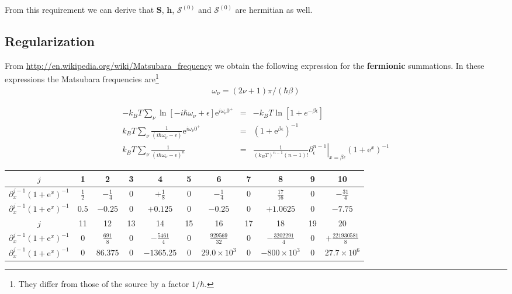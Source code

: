 \documentclass[11pt,a4paper]{report}
\newcommand{\e}[1]{\mathrm{e}^{#1}}%
\newcommand{\mat}[1]{\bm{#1}}  %
\begin{document}
From this requirement we can derive that $\mat{S}$, $\mat{h}$,
$\mat{\mathcal{S}}^{(0)}$ and $\mat{\mathcal{S}}^{(0)}$ are hermitian as well.

\subsection{Regularization}
From \url{http://en.wikipedia.org/wiki/Matsubara_frequency} we obtain
the following expression for the \textbf{fermionic} summations.  In
these expressions the Matsubara frequencies are\footnote{They differ
  from those of the source by a factor $1/\hbar$.}
\begin{eqnarray}
\omega_\nu=(2\nu+1)\pi/(\hbar\beta)
\end{eqnarray}


\begin{eqnarray}
-k_BT\sum_\nu\ln[-i\hbar\omega_\nu+\epsilon]\e{i\omega_\nu0^+}
&=&-k_BT\ln[1+e^{-\beta \epsilon}]
\\
k_BT\sum_\nu \frac{1}{(i\hbar\omega_\nu-\epsilon)}\e{i\omega_\nu 0^+}
&=&(1+\e{\beta \epsilon})^{-1}
\\
k_BT\sum_\nu \frac{1}{(i\hbar\omega_\nu-\epsilon)^n}
&=&\frac{1}{(k_BT)^{n-1}(n-1)!}
\left.\partial_\epsilon^{n-1}\right|_{x=\beta\epsilon}(1+\e{x})^{-1}
\end{eqnarray}
\begin{center}
\begin{tabular}{|c|c|c|c|c|c|c|c|c|c|c|}
\hline
$j$& 1 & 2 & 3 & 4 & 5 &6 &7 &8 & 9 & 10\\
\hline
$\partial^{j-1}_x(1+\e{x})^{-1}$
&$\frac{1}{2}$ 
&$-\frac{1}{4}$ 
&$0$ 
&$+\frac{1}{8}$ 
&$0$ 
&$-\frac{1}{4}$ 
&$0$ 
&$\frac{17}{16}$
&$0$ 
&$-\frac{31}{4}$
\\
\hline
$\partial^{j-1}_x(1+\e{x})^{-1}$
&$0.5$ 
&$-0.25$ 
&$0$ 
&$+0.125$ 
&$0$ 
&$-0.25$ 
&$0$ 
&$+1.0625$
&$0$ 
&$-7.75$
\\
\hline
\hline
$j$& 11 & 12 & 13 & 14 & 15 &16 &17 &18 & 19 & 20\\
\hline
$\partial^{j-1}_x(1+\e{x})^{-1}$
&$0$ 
&$\frac{691}{8}$ 
&$0$ 
&$-\frac{5461}{4}$ 
&$0$ 
&$\frac{929569}{32}$ 
&$0$ 
&$-\frac{3202291}{4}$
&$0$ 
&$+\frac{221930581}{8}$
\\
\hline
$\partial^{j-1}_x(1+\e{x})^{-1}$
&$0$ 
&$86.375$ 
&$0$ 
&$-1365.25$ 
&$0$ 
&$29.0\times10^3$ 
&$0$ 
&$-800\times10^3$
&$0$ 
&$27.7\times 10^6$ %
\\
\hline
\end{tabular}
\end{center}
\end{document}
